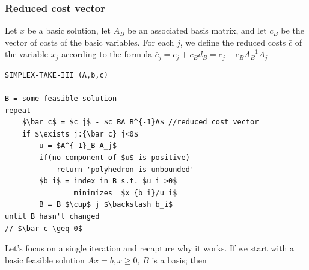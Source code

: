 \subsubsection*{Reduced cost vector}
\begin{Def}
 Let $x$ be a basic solution, let $A_B$ be an associated basis matrix, and let $c_B$ be the vector of costs of the basic variables. For each $j$, we define the reduced costs $\bar c$ of the variable $x_j$ according to the formula 
$\bar c_j = c_j + c_Bd_B = c_j - c_B A^{-1}_B A_j$
\end{Def}


\begin{center}
\begin{lstlisting}
SIMPLEX-TAKE-III (A,b,c)

B = some feasible solution
repeat
    $\bar c$ = $c_j$ - $c_BA_B^{-1}A$ //reduced cost vector
    if $\exists j:{\bar c}_j<0$ 
        u = $A^{-1}_B A_j$ 
        if(no component of $u$ is positive)
            return 'polyhedron is unbounded'
        $b_i$ = index in B s.t. $u_i >0$ 
                minimizes  $x_{b_i}/u_i$
        B = B $\cup$ j $\backslash b_i$ 
until B hasn't changed 
// $\bar c \geq 0$ 
\end{lstlisting}
\end{center}


Let's focus on a single iteration and recapture why it works. If we start with a basic feasible solution $Ax=b, x\geq 0$, $B$ is a basis; then 

